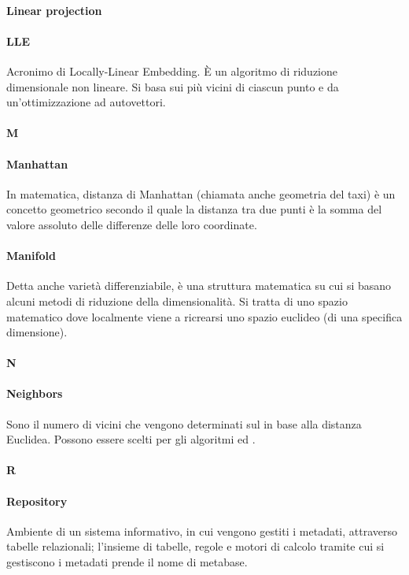\paragraph*{Linear projection}

\paragraph*{LLE}
Acronimo di Locally-Linear Embedding. È un algoritmo di riduzione dimensionale non lineare. Si basa sui più vicini  di ciascun punto e da un'ottimizzazione ad autovettori. 

\paragraph*{M}

\paragraph*{Manhattan}
In matematica, distanza di Manhattan (chiamata anche geometria del taxi) è un concetto geometrico secondo il quale la distanza tra due punti è la somma del valore assoluto delle differenze delle loro coordinate. 

\paragraph*{Manifold}
Detta anche varietà differenziabile, è una struttura matematica su cui si basano alcuni metodi di riduzione della dimensionalità. Si tratta di uno spazio matematico dove localmente viene a ricrearsi uno spazio euclideo (di una specifica dimensione).

\paragraph*{N}

\paragraph*{Neighbors}
Sono il numero di vicini che vengono determinati sul  in base alla distanza Euclidea. Possono essere scelti per gli algoritmi  ed .

\paragraph*{R}

\paragraph*{Repository}
Ambiente di un sistema informativo, in cui vengono gestiti i metadati, attraverso tabelle relazionali; l'insieme di tabelle, regole e motori di calcolo tramite cui si gestiscono i metadati prende il nome di metabase.

